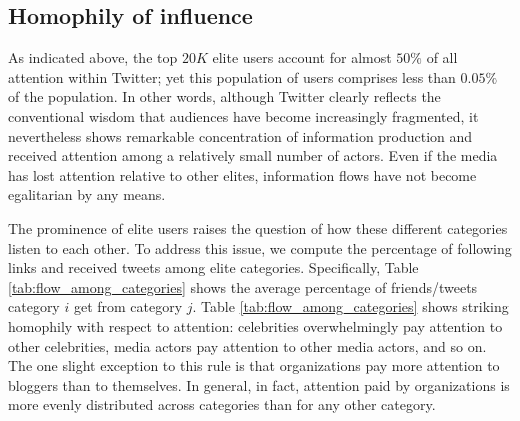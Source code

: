 \documentclass[phd,tocprelim]{cornell}
\begin{document}
\subsection{Homophily of influence}

As indicated above, the top $20K$ elite users account for almost $50 \%$ of
all attention within Twitter; yet this population of users comprises less
than $0.05\%$ of the population.
In other words, although Twitter clearly reflects the conventional wisdom
that audiences have become increasingly fragmented, it nevertheless shows
remarkable concentration of information production and received attention
among a relatively small number of actors. Even if the media has lost
attention relative to other elites, information flows have not become
egalitarian by any means.

The prominence of elite users raises the question of how these different
categories listen to each other.  To address this issue, we compute the
percentage of following links and received tweets among elite
categories. Specifically, Table \ref{tab:flow_among_categories} shows the
average percentage of friends/tweets category $i$ get from category
$j$. Table \ref{tab:flow_among_categories} shows striking homophily with
respect to attention: celebrities overwhelmingly pay attention to other
celebrities, media actors pay attention to other media actors, and so on.
The one slight exception to this rule is that organizations pay more attention
to bloggers than to themselves.  In general, in fact,
attention paid by organizations is more evenly distributed across
categories than for any other category.
\end{document}
